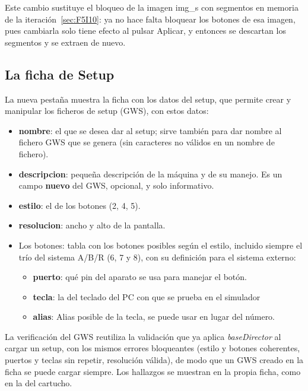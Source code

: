 Este cambio sustituye el bloqueo de la imagen img\_s con segmentos en memoria de la iteración~\ref{sec:F5I10}: ya no hace falta bloquear los botones de esa imagen, pues cambiarla solo tiene efecto al pulsar Aplicar, y entonces se descartan los segmentos y se extraen de nuevo.

\subsection{La ficha de Setup}
\label{sec:F5I12Ficha}

La nueva pestaña muestra la ficha con los datos del setup, que permite crear y manipular los ficheros de setup (GWS), con estos datos:

\begin{itemize}
	\item \textbf{nombre}: el que se desea dar al setup; sirve también para dar nombre al fichero GWS que se genera (sin caracteres no válidos en un nombre de fichero).
	
	\item \textbf{descripcion}: pequeña descripción de la máquina y de su manejo. Es un campo \textbf{nuevo} del GWS, opcional, y solo informativo.
	
	\item \textbf{estilo}: el de los botones (2, 4, 5). 
	
	\item \textbf{resolucion}: ancho y alto de la pantalla.
	
	\item Los botones: tabla con los botones posibles según el estilo, incluido siempre el trío del sistema A/B/R (6, 7 y 8), con su definición para el sistema externo: 
	\begin{itemize}
		\item \textbf{puerto}: qué pin del aparato se usa para manejar el botón. 
		\item \textbf{tecla}: la del teclado del PC con que se prueba en el simulador
		\item \textbf{alias}: Alias posible de la tecla, se puede usar en lugar del número.	
	\end{itemize}
\end{itemize}

La verificación del GWS reutiliza la validación que ya aplica \emph{baseDirector} al cargar un setup, con los mismos errores bloqueantes (estilo y botones coherentes, puertos y teclas sin repetir, resolución válida), de modo que un GWS creado en la ficha se puede cargar siempre. Los hallazgos se muestran en la propia ficha, como en la del cartucho.

